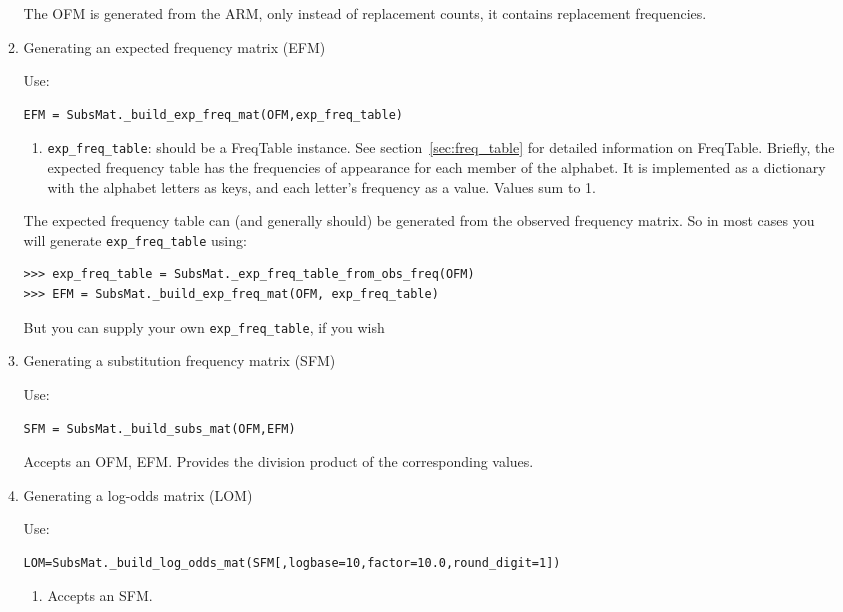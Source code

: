 \documentclass{report}
\begin{document}
\begin{enumerate}
\begin{enumerate}
  The OFM is generated from the ARM, only instead of replacement counts, it contains replacement frequencies.

\item Generating an expected frequency matrix (EFM)

Use:

\begin{verbatim}
EFM = SubsMat._build_exp_freq_mat(OFM,exp_freq_table)
\end{verbatim}

  \begin{enumerate}
    \item \verb|exp_freq_table|: should be a FreqTable instance. See section~\ref{sec:freq_table} for detailed information on FreqTable. Briefly, the expected frequency table has the frequencies of appearance for each member of the alphabet. It is
  implemented as a dictionary with the alphabet letters as keys, and each letter's frequency as a value. Values sum to 1.
  \end{enumerate}

The expected frequency table can (and generally should) be generated from the observed frequency matrix. So in most cases you will generate \verb|exp_freq_table| using:

\begin{verbatim}
>>> exp_freq_table = SubsMat._exp_freq_table_from_obs_freq(OFM)
>>> EFM = SubsMat._build_exp_freq_mat(OFM, exp_freq_table)
\end{verbatim}

But you can supply your own \verb|exp_freq_table|, if you wish

\item Generating a substitution frequency matrix (SFM)

Use:

\begin{verbatim}
SFM = SubsMat._build_subs_mat(OFM,EFM)
\end{verbatim}

  Accepts an OFM, EFM. Provides the division product of the corresponding values.

\item Generating a log-odds matrix (LOM)

   Use:
\begin{verbatim}
LOM=SubsMat._build_log_odds_mat(SFM[,logbase=10,factor=10.0,round_digit=1])
\end{verbatim}

   \begin{enumerate}
     \item Accepts an SFM.


\end{enumerate}
\end{enumerate}
\end{enumerate}
\end{document}
